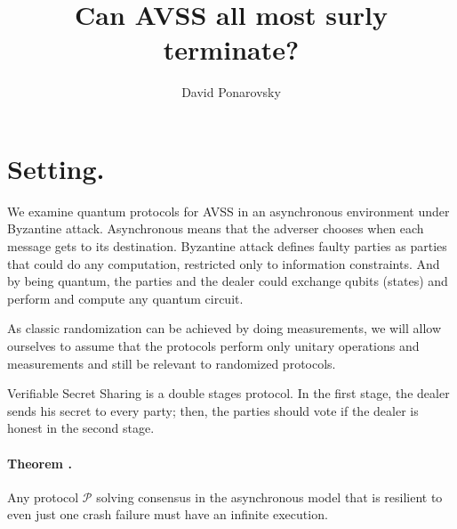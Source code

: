 \documentclass{article}
\begin{document}
\newcommand{\GG}{\tilde{G} }
\newcommand{\TGG}{\(\tilde{G}\) }
\newcommand{\Prb}[1]{ \mathbf{Pr}\left[ {#1} \right] }
\newcommand{\commentt}[1]{\textcolor{blue}{ \textbf{[COMMENT]} #1}}
\newcommand{\ctt}[1]{\commentt{#1}}
\newcommand{\prb}[1]{ \mathbf{Pr} \left[ {#1} \right]}
\newcommand{\onotation}[1]{\(\mathcal{O} \left( {#1}  \right) \)}
\newcommand{\ona}[1]{\onotation{#1}}
\newcommand{\norm}[1]{\left\lVert#1\right\rVert}
\newcommand{\Ov}[2]{\overset{\text{#1}}{\overbrace{#2}}}
\graphicspath{ {./images/} }



\newcommand{\PP}{\mathcal{P} }
\newcommand{\Ue}{ U_{\delta,\varepsilon } }


\title{  Can AVSS all most surly terminate?   }
\author{David Ponarovsky}
\maketitle

\section{Setting.}
We examine quantum protocols for AVSS in an asynchronous environment under Byzantine attack.  Asynchronous means that the adverser chooses when each message gets to its destination. Byzantine attack defines faulty parties as parties that could do any computation, restricted only to information constraints. And by being quantum, the parties and the dealer could exchange qubits (states) and perform and compute any quantum circuit.         

As classic randomization can be achieved by doing measurements, we will allow ourselves to assume that the protocols perform only unitary operations and measurements and still be relevant to randomized protocols.

Verifiable Secret Sharing is a double stages protocol. In the first stage, the dealer sends his secret to every party; then, the parties should vote if the dealer is honest in the second stage.  

\paragraph{Theorem \cite{FLP85}.} Any protocol \(\mathcal{P}\) solving consensus in the asynchronous model that is resilient to even just one crash failure must have an infinite execution. 
\end{document}
